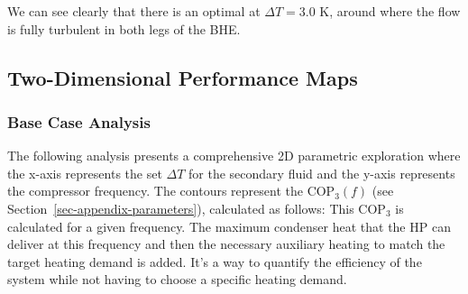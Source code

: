 \documentclass[journal=iecr,manuscript=]{achemso}
\begin{document}
We can see clearly that there is an optimal at \(\Delta T = 3.0\) K,
around where the flow is fully turbulent in both legs of the BHE.

\subsection{Two-Dimensional Performance
Maps}\label{two-dimensional-performance-maps}

\subsubsection{Base Case Analysis}\label{base-case-analysis}

The following analysis presents a comprehensive 2D parametric
exploration where the x-axis represents the set \(\Delta T\) for the
secondary fluid and the y-axis represents the compressor frequency. The
contours represent the \(\text{COP}_3(f)\) (see
Section~\ref{sec-appendix-parameters}), calculated as follows: This
\(\text{COP}_3\) is calculated for a given frequency. The maximum
condenser heat that the HP can deliver at this frequency and then the
necessary auxiliary heating to match the target heating demand is added.
It's a way to quantify the efficiency of the system while not having to
choose a specific heating demand.
\end{document}
